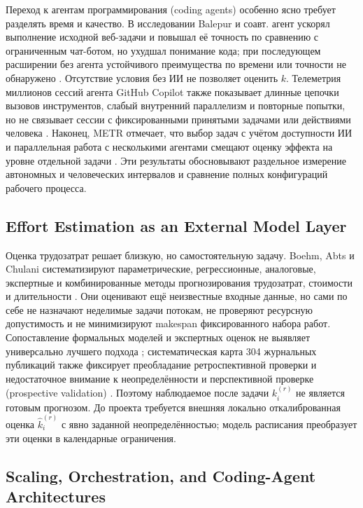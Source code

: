Переход к агентам программирования (coding agents) особенно ясно требует разделять время и качество. В исследовании Balepur и соавт. агент ускорял выполнение исходной веб-задачи и повышал её точность по сравнению с ограниченным чат-ботом, но ухудшал понимание кода; при последующем расширении без агента устойчивого преимущества по времени или точности не обнаружено \cite{balepur2026impaired}. Отсутствие условия без ИИ не позволяет оценить $k$. Телеметрия миллионов сессий агента GitHub Copilot также показывает длинные цепочки вызовов инструментов, слабый внутренний параллелизм и повторные попытки, но не связывает сессии с фиксированными принятыми задачами или действиями человека \cite{liu2026agenticcoding}. Наконец, METR отмечает, что выбор задач с учётом доступности ИИ и параллельная работа с несколькими агентами смещают оценку эффекта на уровне отдельной задачи \cite{metr2026uplift}. Эти результаты обосновывают раздельное измерение автономных и человеческих интервалов и сравнение полных конфигураций рабочего процесса.

\subsection{Effort Estimation as an External Model Layer}

Оценка трудозатрат решает близкую, но самостоятельную задачу. Boehm, Abts и Chulani систематизируют параметрические, регрессионные, аналоговые, экспертные и комбинированные методы прогнозирования трудозатрат, стоимости и длительности \cite{boehm2000survey}. Они оценивают ещё неизвестные входные данные, но сами по себе не назначают неделимые задачи потокам, не проверяют ресурсную допустимость и не минимизируют makespan фиксированного набора работ. Сопоставление формальных моделей и экспертных оценок не выявляет универсально лучшего подхода \cite{jorgensen2007forecasting}; систематическая карта 304 журнальных публикаций также фиксирует преобладание ретроспективной проверки и недостаточное внимание к неопределённости и перспективной проверке (prospective validation) \cite{jorgensenShepperd2007systematic}. Поэтому наблюдаемое после задачи $k_i^{(r)}$ не является готовым прогнозом. До проекта требуется внешняя локально откалиброванная оценка $\hat{k}_i^{(r)}$ с явно заданной неопределённостью; модель расписания преобразует эти оценки в календарные ограничения.

\subsection{Scaling, Orchestration, and Coding-Agent Architectures}

